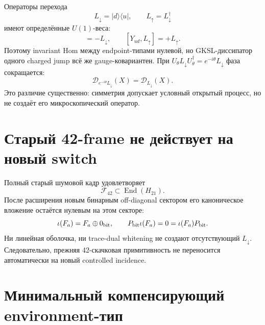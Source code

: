 Операторы перехода
\begin{equation}
 L_\downarrow=|d\rangle\langle u|,
 \qquad L_\uparrow=L_\downarrow^\dagger
 \label{eq:v8-binary-carrier-transition-operators}
\end{equation}
имеют определённые $U(1)$-веса:
\begin{equation}
 [Y_{ud},L_\downarrow]=-L_\downarrow,
 \qquad [Y_{ud},L_\uparrow]=+L_\uparrow.
 \label{eq:v8-binary-carrier-transition-charges}
\end{equation}
Поэтому invariant Hom между endpoint-типами нулевой, но GKSL-диссипатор
одного charged jump всё же gauge-ковариантен. При
$U_\theta L_\downarrow U_\theta^\dagger=e^{-i\theta}L_\downarrow$
фаза сокращается:
\begin{equation}
 \mathcal D_{e^{-i\theta}L_\downarrow}(X)
 =\mathcal D_{L_\downarrow}(X).
 \label{eq:v8-binary-carrier-dissipator-covariance}
\end{equation}
Это различие существенно: симметрия допускает условный открытый процесс,
но не создаёт его микроскопический оператор.

\section{Старый 42-frame не действует на новый switch}

Полный старый шумовой кадр удовлетворяет
\begin{equation}
 \mathcal F_{42}\subset\operatorname{End}(H_{21}).
 \label{eq:v8-binary-carrier-old-frame-ambient}
\end{equation}
После расширения новым бинарным off-diagonal сектором его каноническое
вложение остаётся нулевым на этом секторе:
\begin{equation}
 \iota(F_a)=F_a\oplus0_{\rm bit},
 \qquad P_{\rm bit}\iota(F_a)=0=\iota(F_a)P_{\rm bit}.
 \label{eq:v8-binary-carrier-old-frame-zero-extension}
\end{equation}
Ни линейная оболочка, ни trace-dual whitening не создают отсутствующий
$L_\downarrow$. Следовательно, прежняя 42-скачковая примитивность не
переносится автоматически на новый controlled incidence.

\section{Минимальный компенсирующий environment-тип}

